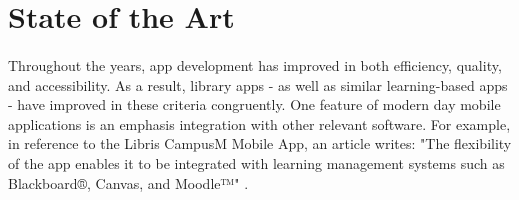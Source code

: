 \begin{itemize}
    \end{itemize}
    
    
\section{State of the Art}
    \begin{itemize}
    \paragraph{}
    Throughout the years, app development has improved in both efficiency, quality, and accessibility. As a result, library apps - as well as similar learning-based apps - have improved in these criteria congruently. One feature of modern day mobile applications is an emphasis integration with other relevant software. For example, in reference to the Libris CampusM Mobile App, an article writes: "The flexibility of the app enables it to be integrated with learning management systems such as Blackboard®, Canvas, and Moodle™" \cite{campusM}. 
    
    \paragraph{}

\end{itemize}

